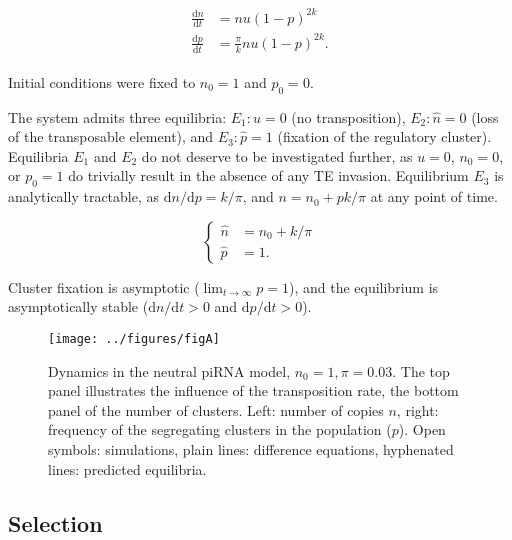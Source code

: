 \documentclass[10pt,a4paper]{article}
\begin{document}
\begin{align}\label{eq:neutral}
\begin{split}
\frac{\mathrm d n}{\mathrm d t} &= n u (1-p)^{2k} \\
\frac{\mathrm d p}{\mathrm d t} &= \frac{\pi}{k} n u (1-p)^{2k}.
\end{split}
\end{align}

Initial conditions were fixed to $n_0 = 1$ and $p_0 = 0$. 

The system admits three equilibria: $E_1: u = 0$ (no transposition), $E_2: \hat n = 0$ (loss of the transposable element), and $E_3: \hat p = 1$ (fixation of the regulatory cluster). Equilibria $E_1$ and $E_2$ do not deserve to be investigated further, as $u=0$, $n_0=0$, or $p_0=1$ do trivially result in the absence of any TE invasion. Equilibrium $E_3$ is analytically tractable, as $\mathrm d n / \mathrm d p = k/\pi$, and $n = n_0 + pk/\pi$ at any point of time. 

\begin{equation}\label{eq:eqneutral}
\begin{cases}
\hat n &= n_0 + k/\pi \\
\hat p &= 1.
\end{cases}
\end{equation}

Cluster fixation is asymptotic ($\lim_{t \rightarrow \infty} p = 1$), and the equilibrium is asymptotically stable ($\mathrm d n /\mathrm d t > 0$ and $\mathrm d p/ \mathrm d t > 0$). 

\begin{figure}[h]
\begin{adjustwidth}{-1in}{0in}
\begin{flushright}
	\texttt{[image: ../figures/figA]}
\caption{\label{fig:figA} Dynamics in the neutral piRNA model, $n_0=1, \pi=0.03$. The top panel illustrates the influence of the transposition rate, the bottom panel of the number of clusters. Left: number of copies $n$, right: frequency of the segregating clusters in the population ($p$). Open symbols: simulations, plain lines: difference equations, hyphenated lines: predicted equilibria. }
\end{flushright}\end{adjustwidth}
\end{figure}



\subsection{Selection}
\end{document}
